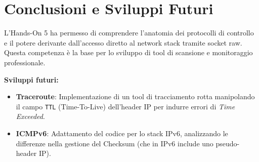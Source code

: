\documentclass[a4paper,12pt]{article}
\begin{document}
\section{Conclusioni e Sviluppi Futuri}
L'Hands-On 5 ha permesso di comprendere l'anatomia dei protocolli di controllo e il potere derivante dall'accesso diretto al network stack tramite socket raw. Questa competenza è la base per lo sviluppo di tool di scansione e monitoraggio professionale.

\noindent \textbf{Sviluppi futuri:}
\begin{itemize}
    \item \textbf{Traceroute}: Implementazione di un tool di tracciamento rotta manipolando il campo \texttt{TTL} (Time-To-Live) dell'header IP per indurre errori di \textit{Time Exceeded}.
    \item \textbf{ICMPv6}: Adattamento del codice per lo stack IPv6, analizzando le differenze nella gestione del Checksum (che in IPv6 include uno pseudo-header IP).
\end{itemize}
\end{document}
